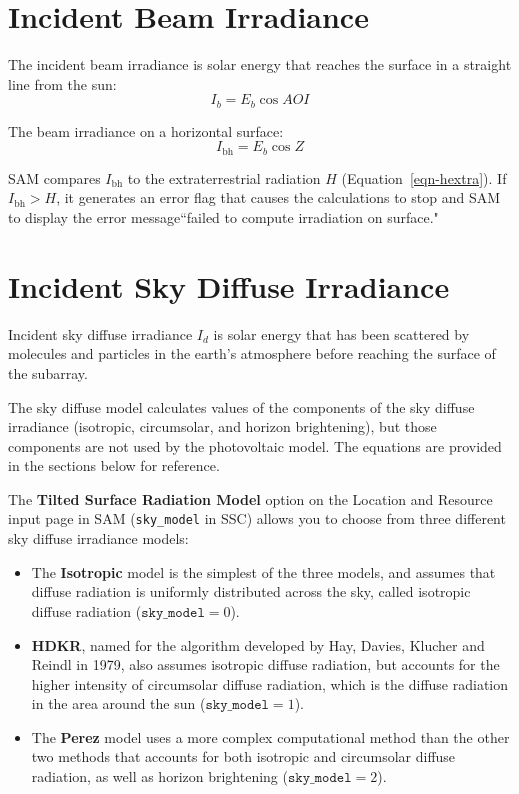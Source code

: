 \documentclass[12pt,letterpaper]{article}
\newcommand\AOI{\ensuremath{\mathit{AOI}}}
\begin{document}
\section{Incident Beam Irradiance}\label{sec-incidentbeam}

The incident beam irradiance is solar energy that reaches the surface in a straight line from the sun:
\begin{equation}
I_b = E_b\cos\AOI
\end{equation}

The beam irradiance on a horizontal surface:
\begin{equation}\label{eqn-hbeam}
I_{\mathrm{bh}}=E_b\cos Z
\end{equation}

SAM compares $I_{\mathrm{bh}}$ to the extraterrestrial radiation $H$ (Equation~\ref{eqn-hextra}). If $I_{\mathrm{bh}}>H$, it generates an error flag that causes the calculations to stop and SAM to display the error message``failed to compute irradiation on surface."

\section{Incident Sky Diffuse Irradiance}

Incident sky diffuse irradiance $I_d$ is solar energy that has been scattered by molecules and particles in the earth's atmosphere before reaching the surface of the subarray.

The sky diffuse model calculates values of the components of the sky diffuse irradiance (isotropic, circumsolar, and horizon brightening), but those components are not used by the photovoltaic model. The equations are provided in the sections below for reference.%

The \textbf{Tilted Surface Radiation Model} option on the Location and Resource input page in SAM (\texttt{sky\_model} in SSC) allows you to choose from three different sky diffuse irradiance models:

\begin{itemize}
\item The \textbf{Isotropic} model is the simplest of the three models, and assumes that diffuse radiation is uniformly distributed across the sky, called isotropic diffuse radiation ($\mathtt{sky\_model} = 0$).
\item \textbf{HDKR}, named for the algorithm developed by Hay, Davies, Klucher and Reindl in 1979, also assumes isotropic diffuse radiation, but accounts for the higher intensity of circumsolar diffuse radiation, which is the diffuse radiation in the area around the sun ($\mathtt{sky\_model} = 1$).
\item The \textbf{Perez} model uses a more complex computational method than the other two methods that accounts for both isotropic and circumsolar diffuse radiation, as well as horizon brightening ($\mathtt{sky\_model} = 2$). 
\end{itemize}
\end{document}
